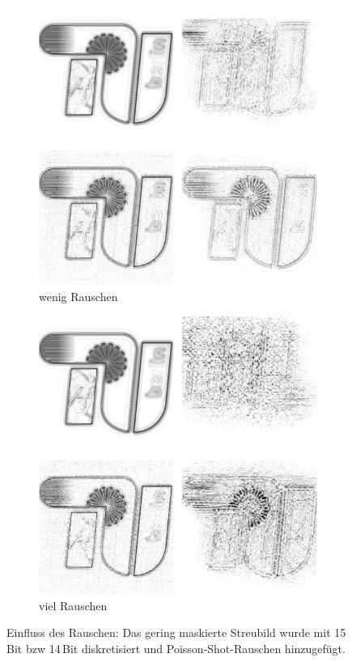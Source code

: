 \begin{figure}
	\begin{subfigure}[b]{0.45\textwidth}
		\includegraphics[width=\textwidth]{images/recon2d-mask16bit16.png}
		\caption{wenig Rauschen}
	\end{subfigure}
	\hspace*{\fill}
	\begin{subfigure}[b]{0.45\textwidth}
		\includegraphics[width=\textwidth]{images/recon2d-mask16bit14.png}
		\caption{viel Rauschen}	
	\end{subfigure}
	\caption[2D Rekonstruktion:Rauschen]{Einfluss des Rauschen: Das gering maskierte Streubild wurde mit 15\,Bit bzw 14\,Bit diskretisiert und Poisson-Shot-Rauschen hinzugefügt.}
	\label{fig:recon2d-noise}
\end{figure}

